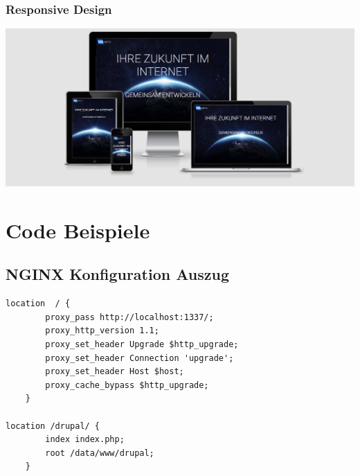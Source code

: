 \documentclass[11pt,a4paper]{article}
\begin{document}
\begin{appendices}
\subsubsection{Responsive Design}
\label{sec:responsive}
\includegraphics[scale=0.3]{responsive}
\section{Code Beispiele}
\subsection{NGINX Konfiguration Auszug}
\label{sec:nginx}
\begin{lstlisting}[frame=single,   basicstyle=\footnotesize]
location  / {
        proxy_pass http://localhost:1337/;
        proxy_http_version 1.1;
        proxy_set_header Upgrade $http_upgrade;
        proxy_set_header Connection 'upgrade';
        proxy_set_header Host $host;
        proxy_cache_bypass $http_upgrade;
    }
    
location /drupal/ {
        index index.php;
        root /data/www/drupal;
    }
\end{lstlisting}
\end{appendices}
\end{document}
